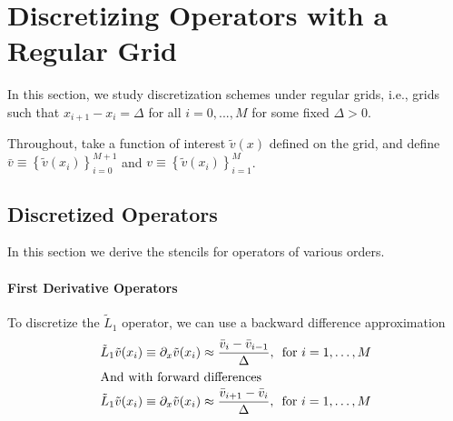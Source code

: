 \documentclass[11pt]{article}
\newcommand{\set}[1]{\ensuremath{\left\{{#1}\right\}}}
\newcommand{\D}[1][]{\ensuremath{\partial_{#1}}}
\theoremstyle{definition}
\begin{document}
\section{Discretizing Operators with a Regular Grid}
In this section, we study discretization schemes under regular grids, i.e., grids such that $x_{i+1} - x_i = \Delta$ for all $i = 0,...,M$ for some fixed $\Delta > 0$.

Throughout, take a function of interest $\tilde{v}(x)$ defined on the grid, and define $\bar{v} \equiv \set{\tilde{v}(x_i)}_{i=0}^{M+1}$ and $v \equiv \set{\tilde{v}(x_i)}_{i=1}^{M}$.

\subsection{Discretized Operators}
In this section we derive the stencils for operators of various orders.

\paragraph{First Derivative Operators}
To discretize the $\tilde{L}_1$ operator, we can use a backward difference approximation
 \begin{align}
\tilde{L}_1 \tilde{v}(x_i) &\equiv \D[x] \tilde{v}(x_i) \approx \frac{\bar{v}_i - \bar{v}_{i-1}}{\Delta},\, \text{ for } i = 1,\ldots, M\label{eq:first-order-bd}\\
\intertext{And with forward differences}
\tilde{L}_1 \tilde{v}(x_i) &\equiv \D[x] \tilde{v}(x_i) \approx \frac{\bar{v}_{i+1} - \bar{v}_i}{\Delta},\, \text{ for } i = 1,\ldots, M\label{eq:first-order-fd}
\end{align}
\end{document}
